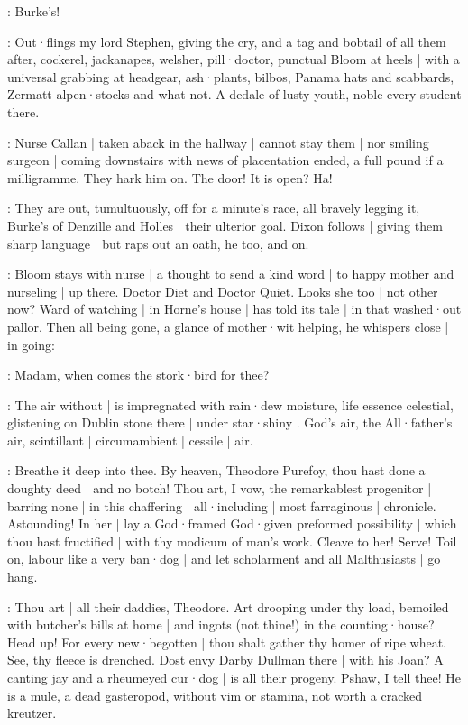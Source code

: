 \stephen:
Burke's!

:
Out·flings my lord Stephen,
giving the cry,
and a tag and bobtail
of all them after,
cockerel,
jackanapes,
welsher,
pill·doctor,
punctual Bloom at heels |
with a universal grabbing at headgear,
ash·plants,
bilbos,
Panama hats and scabbards,
Zermatt alpen·stocks and what not.
A dedale of lusty youth,
noble every student there.

:
Nurse Callan |
taken aback in the hallway |
cannot stay them |
nor smiling surgeon |
coming downstairs with news of placentation ended,
a full pound if a milligramme.
They hark him on.
The door!
It is open?
Ha!

:
They are out,
tumultuously,
off for a minute's race,
all bravely legging it,
Burke's of Denzille and Holles |
their ulterior goal.
Dixon follows |
giving them sharp language |
but raps out an oath,
he too,
and on.

:
Bloom stays with nurse |
a thought to send a kind word |
to happy mother and nurseling |
up there.
Doctor Diet and Doctor Quiet.
Looks she too |
not other now?
Ward of watching |
in Horne's house |
has told its tale |
in that washed·out pallor.
Then all being gone,
a glance of mother·wit helping,
he whispers close |
in going:

\Bloom:
Madam,
when comes the stork·bird for thee?

:
The air without |
is impregnated with rain·dew moisture,
life essence celestial,
glistening on Dublin stone there |
under star·shiny .
God's air,
the All·father's air,
scintillant |
circumambient |
cessile |
air.

:
Breathe it deep into thee.
By heaven,
Theodore Purefoy,
thou hast done a doughty deed |
and no botch!
Thou art,
I vow,
the remarkablest progenitor |
barring none |
in this chaffering |
all·including |
most farraginous |
chronicle.
Astounding!
In her |
lay a God·framed God·given preformed possibility |
which thou hast fructified |
with thy modicum of man's work.
Cleave to her!
Serve!
Toil on,
labour like a very ban·dog |
and let scholarment and all Malthusiasts |
go hang.

:
Thou art |
all their daddies,
Theodore.
Art drooping under thy load,
bemoiled with butcher's bills at home |
and ingots
(not thine!)
in the counting·house?
Head up!
For every new·begotten |
thou shalt gather thy homer of ripe wheat.
See,
thy fleece is drenched.
Dost envy Darby Dullman there |
with his Joan?
A canting jay and a rheumeyed cur·dog |
is all their progeny.
Pshaw,
I tell thee!
He is a mule,
a dead gasteropod,
without vim or stamina,
not worth a cracked kreutzer.

